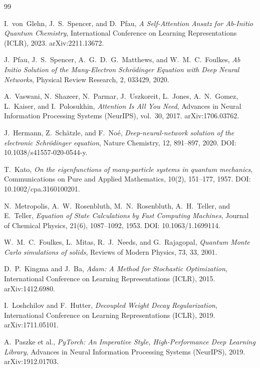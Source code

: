 \begin{thebibliography}{99}

I.~von~Glehn, J.~S.~Spencer, and D.~Pfau,
\newblock \emph{A Self-Attention Ansatz for Ab-Initio Quantum Chemistry},
\newblock International Conference on Learning Representations (ICLR), 2023.
\newblock arXiv:2211.13672.

J.~Pfau, J.~S.~Spencer, A.~G.~D.~G.~Matthews, and W.~M.~C.~Foulkes,
\newblock \emph{Ab Initio Solution of the Many-Electron Schr{\"o}dinger Equation with Deep Neural Networks},
\newblock Physical Review Research, 2, 033429, 2020.

A.~Vaswani, N.~Shazeer, N.~Parmar, J.~Uszkoreit, L.~Jones, A.~N.~Gomez, L.~Kaiser, and I.~Polosukhin,
\newblock \emph{Attention Is All You Need},
\newblock Advances in Neural Information Processing Systems (NeurIPS), vol.~30, 2017.
\newblock arXiv:1706.03762.

J.~Hermann, Z.~Sch{\"a}tzle, and F.~No{\'e},
\newblock \emph{Deep-neural-network solution of the electronic Schr{\"o}dinger equation},
\newblock Nature Chemistry, 12, 891--897, 2020.
\newblock DOI: 10.1038/s41557-020-0544-y.

T.~Kato,
\newblock \emph{On the eigenfunctions of many-particle systems in quantum mechanics},
\newblock Communications on Pure and Applied Mathematics, 10(2), 151--177, 1957.
\newblock DOI: 10.1002/cpa.3160100201.

N.~Metropolis, A.~W.~Rosenbluth, M.~N.~Rosenbluth, A.~H.~Teller, and E.~Teller,
\newblock \emph{Equation of State Calculations by Fast Computing Machines},
\newblock Journal of Chemical Physics, 21(6), 1087--1092, 1953.
\newblock DOI: 10.1063/1.1699114.

W.~M.~C.~Foulkes, L.~Mitas, R.~J.~Needs, and G.~Rajagopal,
\newblock \emph{Quantum Monte Carlo simulations of solids},
\newblock Reviews of Modern Physics, 73, 33, 2001.

D.~P.~Kingma and J.~Ba,
\newblock \emph{Adam: A Method for Stochastic Optimization},
\newblock International Conference on Learning Representations (ICLR), 2015.
\newblock arXiv:1412.6980.

I.~Loshchilov and F.~Hutter,
\newblock \emph{Decoupled Weight Decay Regularization},
\newblock International Conference on Learning Representations (ICLR), 2019.
\newblock arXiv:1711.05101.

A.~Paszke et al.,
\newblock \emph{PyTorch: An Imperative Style, High-Performance Deep Learning Library},
\newblock Advances in Neural Information Processing Systems (NeurIPS), 2019.
\newblock arXiv:1912.01703.

\end{thebibliography}


